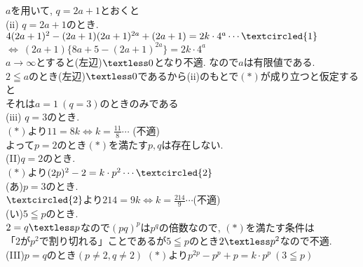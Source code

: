 \documentclass{article}
\begin{document}
$a$を用いて, $q=2a+1$とおくと\vspace{0.1in}\\
(ii) $q=2a+1$のとき.\vspace{0.1in}\\
$4(2a+1)^2-(2a+1)(2a+1)^{2a}+(2a+1)=2k\cdot 4^a\cdots \textcircled{1}$\vspace{0.1in}\\
$\Leftrightarrow\ (2a+1)\{ 8a+5-(2a+1)^{2a}\}=2k\cdot4^a$\vspace{0.1in}\\
$a\rightarrow \infty$とすると(左辺)$\textless 0$となり不適. なので$a$は有限値である.\vspace{0.1in}\\
$2\leqq a$のとき(左辺)$\textless 0$であるから(ii)のもとで$(\ast)$が成り立つと仮定すると\vspace{0.1in}\\
それは$a=1\ (q=3)$のときのみである\vspace{0.1in}\\
(iii) $q=3$のとき.\vspace{0.1in}\\
$(\ast)$より$11=8k \Leftrightarrow k=\frac{11}{8} \cdots $ (不適)\vspace{0.1in}\\
よって$p=2$のとき$(\ast)$を満たす$p,q$は存在しない.\vspace{0.2in}\\
(II)$q=2$のとき.\vspace{0.1in}\\
$(\ast)$より$(2p)^2-2=k\cdot p^2\cdots \textcircled {2}$\vspace{0.1in}\\
(あ)$p=3$のとき.\vspace{0.1in}\\
$\textcircled{2}$より$214=9k \Leftrightarrow k=\frac{214}{9} \cdots$(不適)\vspace{0.1in}\\
\newpage
(い)$5\leqq p$のとき. \vspace{0.1in}\\
$2=q\textless p$なので$(pq)^p$は$p^q$の倍数なので, $(\ast)$を満たす条件は\vspace{0.1in}\\
「$2$が$p^2$で割り切れる」ことであるが$5\leqq p$のとき$2\textless p^2$なので不適.\vspace{0.2in}\\
(III)$p=q$のとき$(p\neq 2, q\neq 2)$
$(\ast)$より$p^{2p}-p^p+p=k\cdot p^p\ (3\leqq p)$\vspace{0.1in}\\
\end{document}
